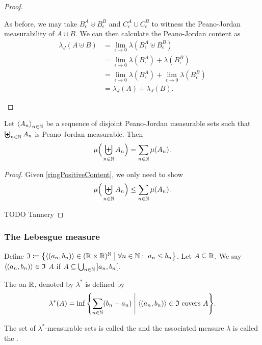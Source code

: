 \begin{proof}
\begin{itemize}
As before, we may take $B_\epsilon^A\uplus B_\epsilon^B$ and $C_\epsilon^A \cup C_\epsilon^B$ to witness the Peano-Jordan measurability of $A\uplus B$. We can then calculate the Peano-Jordan content as
\begin{align*}
\lambda_J(A\uplus B) &= \lim_{\epsilon \to 0}\lambda(B_\epsilon^A\uplus B_\epsilon^B) \\
&= \lim_{\epsilon \to 0}\lambda(B_\epsilon^A) + \lambda(B_\epsilon^B) \\
&= \lim_{\epsilon \to 0}\lambda(B_\epsilon^A) + \lim_{\epsilon \to 0}\lambda(B_\epsilon^B) \\
&= \lambda_J(A) + \lambda_J(B).
\end{align*}
\end{itemize}
\end{proof}

\begin{proposition}
Let $\left\langle A_n \right\rangle_{n\in \mathbb{N}}$ be a sequence of disjoint Peano-Jordan measurable sets such that $\biguplus_{n\in\mathbb{N}}A_n$ is Peano-Jordan measurable. Then
\[ \mu\Big(\biguplus_{n\in\mathbb{N}}A_n\Big) = \sum_{n\in\mathbb{N}}\mu(A_n). \]
\end{proposition}
\begin{proof}
Given \ref{ringPositiveContent}, we only need to show
\[ \mu\Big(\biguplus_{n\in\mathbb{N}}A_n\Big) \leq \sum_{n\in\mathbb{N}}\mu(A_n). \]

TODO Tannery
\end{proof}

\subsubsection{The Lebesgue measure}
\begin{definition}
Define $\mathfrak{I} \defeq \setbuilder{\seq{(a_n, b_n)} \in (\R \times \R)^\N}{\forall n\in \N: \; a_n \leq b_n}$. Let $A\subseteq \mathbb{R}$. We say $\left\langle (a_n, b_n) \right\rangle \in \mathfrak{I}$  $A$ if $A \subseteq \bigcup_{n\in\N} \interval[o]{a_n, b_n}$.

The  on $\mathbb{R}$, denoted by $\lambda^*$ is defined by
\[ \lambda^*(A) = \inf\setbuilder{\sum_{n\in \N}(b_n-a_n)}{\text{$\seq{(a_n, b_n)} \in \mathfrak{I}$ covers $A$}}. \]


The set of $\lambda^*$-measurable sets is called the  and the associated measure $\lambda$ is called the .
\end{definition}

